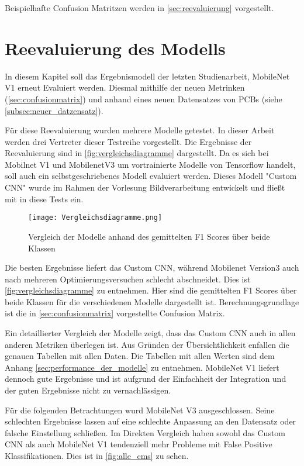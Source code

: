 Beispielhafte Confusion Matritzen werden in \autoref{sec:reevaluierung} vorgestellt.

\section{Reevaluierung des Modells} \label{sec:reevaluierung}

In diesem Kapitel soll das Ergebnismodell der letzten Studienarbeit, MobileNet V1 erneut Evaluiert werden. Diesmal mithilfe der neuen Metrinken (\autoref{sec:confusionmatrix}) und anhand eines neuen Datensatzes von PCBs (siehe \autoref{subsec:neuer_datzensatz}).

Für diese Reevaluierung wurden mehrere Modelle getestet. In dieser Arbeit werden drei Vertreter dieser Testreihe vorgestellt. Die Ergebnisse der Reevaluierung sind in \autoref{fig:vergleichsdiagramme} dargestellt.
Da es sich bei Mobilnet V1 und MobilenetV3 um vortrainierte Modelle von Tensorflow handelt, soll auch ein selbstgeschriebenes Modell evaluiert werden. Dieses Modell "Custom \ac{CNN}"  wurde im Rahmen der Vorlesung Bildverarbeitung entwickelt und fließt mit in diese Tests ein. 

\begin{figure}[h]
    \centering
    \texttt{[image: Vergleichsdiagramme.png]}
    \caption{Vergleich der Modelle anhand des gemittelten F1 Scores über beide Klassen}
    \label{fig:vergleichsdiagramme}
\end{figure}

Die besten Ergebnisse liefert das Custom \ac{CNN}, während Mobilenet Version3 auch nach mehreren Optimierungsversuchen schlecht abschneidet.
Dies ist \autoref{fig:vergleichsdiagramme} zu entnehmen. Hier sind die gemittelten F1 Scores über beide Klassen für die verschiedenen Modelle dargestellt ist. Berechnungsgrundlage ist die in \autoref{sec:confusionmatrix} vorgestellte Confusion Matrix.

Ein detaillierter Vergleich der Modelle zeigt, dass das Custom \ac{CNN} auch in allen anderen Metriken überlegen ist. Aus Gründen der Übersichtlichkeit enfallen die genauen Tabellen mit allen Daten. Die Tabellen mit allen Werten sind dem Anhang \autoref{sec:performance_der_modelle} zu entnehmen. MobileNet V1 liefert dennoch gute Ergebnisse und ist aufgrund der Einfachheit der Integration und der guten Ergebnisse nicht zu vernachlässigen. 

Für die folgenden Betrachtungen wurd MobileNet V3 ausgeschlossen. Seine schlechten Ergebnisse lassen auf eine schlechte Anpassung an den Datensatz oder falsche Einstellung schließen.
Im Direkten Vergleich haben sowohl das Custom CNN als auch MobileNet V1 tendenziell mehr Probleme mit False Positive Klassifikationen. Dies ist in \autoref{fig:alle_cms} zu sehen.

